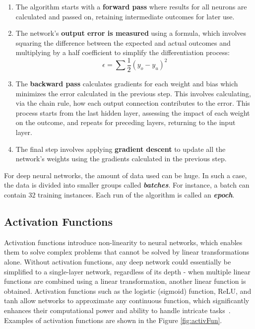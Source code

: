 \begin{enumerate}
    \item The algorithm starts with a \textbf{forward pass} where results for all neurons are calculated and passed on, retaining intermediate outcomes for later use.
    \item The network's \textbf{output error is measured} using a formula, which involves squaring the difference between the expected and actual outcomes and multiplying by a half coefficient to simplify the differentiation process:
    \begin{equation*}
            \epsilon = \sum \frac{1}{2} (y_{o} - y_{u})^2
    \end{equation*}
    \item The \textbf{backward pass} calculates gradients for each weight and bias which minimizes the error calculated in the previous step. This involves calculating, via the chain rule, how each output connection contributes to the error. This process starts from the last hidden layer, assessing the impact of each weight on the outcome, and repeats for preceding layers, returning to the input layer.
    \item The final step involves applying \textbf{gradient descent} to update all the network's weights using the gradients calculated in the previous step.
\end{enumerate}
 
For deep neural networks, the amount of data used can be huge. In such a case, the data is divided into smaller groups called \textit{\textbf{batches}}. For instance, a batch can contain $32$ training instances. Each run of the algorithm is called an \textit{\textbf{epoch}}.

\subsection{Activation Functions}

Activation functions introduce non-linearity to neural networks, which enables them to solve complex problems that cannot be solved by linear transformations alone. Without activation functions, any deep network could essentially be simplified to a single-layer network, regardless of its depth - when multiple linear functions are combined using a linear transformation, another linear function is obtained. Activation functions such as the logistic (sigmoid) function, ReLU, and tanh allow networks to approximate any continuous function, which significantly enhances their computational power and ability to handle intricate tasks~\cite{ActivationFunctions}. Examples of activation functions are shown in the Figure \ref{fig:activFun}.

